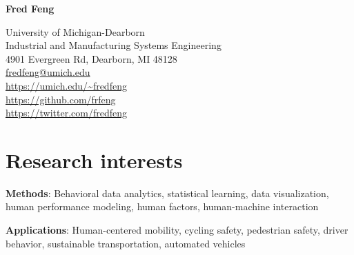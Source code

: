 \documentclass[11pt]{article}
\title{\vspace{-6em}}   %
\author{}
\date{}
\newenvironment{main}
{\begin{adjustwidth}{3em}{}}
{\end{adjustwidth}}
\begin{document}
\maketitle

\begin{multicols}{2}

{\selectfont\Huge\textbf{Fred Feng}}  %

\hfill\break
\hfill\break
\hfill\break

\begin{flushright}
{
University of Michigan-Dearborn\\
Industrial and Manufacturing Systems Engineering\\
4901 Evergreen Rd, Dearborn, MI 48128\\
\href{mailto:fredfeng@umich.edu}{fredfeng@umich.edu}\\
\url{https://umich.edu/~fredfeng}\\
\url{https://github.com/frfeng}\\
\url{https://twitter.com/fredfeng}\\
}
\end{flushright}
\end{multicols}

\vspace{-6ex}
\noindent\makebox[\linewidth]{\rule{\textwidth}{0.8pt}}

\section*{Research interests}
\begin{main}

\textbf{Methods}:
Behavioral data analytics, 
statistical learning, 
data visualization, 
human performance modeling, 
human factors, 
human-machine interaction

\textbf{Applications}:
Human-centered mobility, 
cycling safety, 
pedestrian safety, 
driver behavior, 
sustainable transportation, 
automated vehicles

\end{main}
\end{document}
